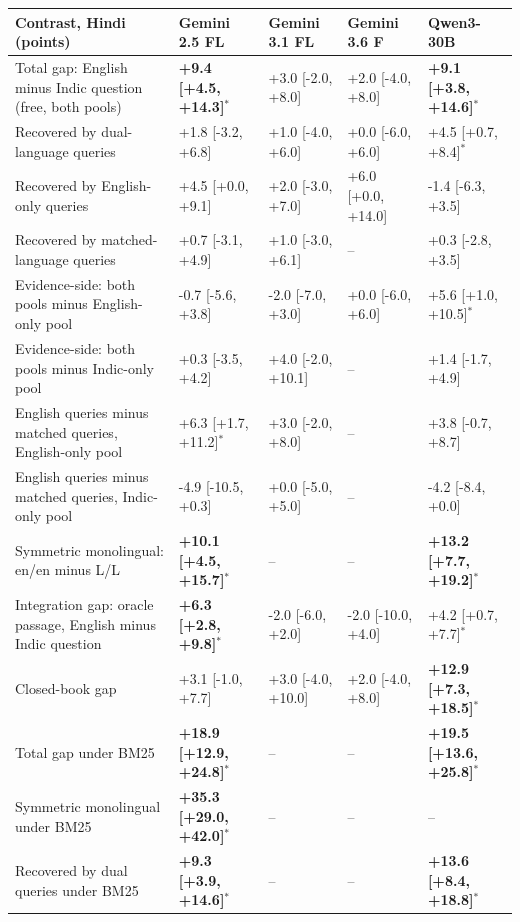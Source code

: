 \begin{table}[t]\centering\footnotesize
\setlength{\tabcolsep}{3pt}
\begin{tabular}{@{}p{5.2cm}llll@{}}
\toprule
Contrast, Hindi (points) & Gemini 2.5 FL & Gemini 3.1 FL & Gemini 3.6 F & Qwen3-30B \\
\midrule
Total gap: English minus Indic question (free, both pools) & \textbf{+9.4 [+4.5, +14.3]$^{*}$} & +3.0 [-2.0, +8.0] & +2.0 [-4.0, +8.0] & \textbf{+9.1 [+3.8, +14.6]$^{*}$} \\
Recovered by dual-language queries & +1.8 [-3.2, +6.8] & +1.0 [-4.0, +6.0] & +0.0 [-6.0, +6.0] & +4.5 [+0.7, +8.4]$^{*}$ \\
Recovered by English-only queries & +4.5 [+0.0, +9.1] & +2.0 [-3.0, +7.0] & +6.0 [+0.0, +14.0] & -1.4 [-6.3, +3.5] \\
Recovered by matched-language queries & +0.7 [-3.1, +4.9] & +1.0 [-3.0, +6.1] & -- & +0.3 [-2.8, +3.5] \\
Evidence-side: both pools minus English-only pool & -0.7 [-5.6, +3.8] & -2.0 [-7.0, +3.0] & +0.0 [-6.0, +6.0] & +5.6 [+1.0, +10.5]$^{*}$ \\
Evidence-side: both pools minus Indic-only pool & +0.3 [-3.5, +4.2] & +4.0 [-2.0, +10.1] & -- & +1.4 [-1.7, +4.9] \\
English queries minus matched queries, English-only pool & +6.3 [+1.7, +11.2]$^{*}$ & +3.0 [-2.0, +8.0] & -- & +3.8 [-0.7, +8.7] \\
English queries minus matched queries, Indic-only pool & -4.9 [-10.5, +0.3] & +0.0 [-5.0, +5.0] & -- & -4.2 [-8.4, +0.0] \\
Symmetric monolingual: en/en minus L/L & \textbf{+10.1 [+4.5, +15.7]$^{*}$} & -- & -- & \textbf{+13.2 [+7.7, +19.2]$^{*}$} \\
Integration gap: oracle passage, English minus Indic question & \textbf{+6.3 [+2.8, +9.8]$^{*}$} & -2.0 [-6.0, +2.0] & -2.0 [-10.0, +4.0] & +4.2 [+0.7, +7.7]$^{*}$ \\
Closed-book gap & +3.1 [-1.0, +7.7] & +3.0 [-4.0, +10.0] & +2.0 [-4.0, +8.0] & \textbf{+12.9 [+7.3, +18.5]$^{*}$} \\
Total gap under BM25 & \textbf{+18.9 [+12.9, +24.8]$^{*}$} & -- & -- & \textbf{+19.5 [+13.6, +25.8]$^{*}$} \\
Symmetric monolingual under BM25 & \textbf{+35.3 [+29.0, +42.0]$^{*}$} & -- & -- & -- \\
Recovered by dual queries under BM25 & \textbf{+9.3 [+3.9, +14.6]$^{*}$} & -- & -- & \textbf{+13.6 [+8.4, +18.8]$^{*}$} \\

\end{tabular}
\end{table}
